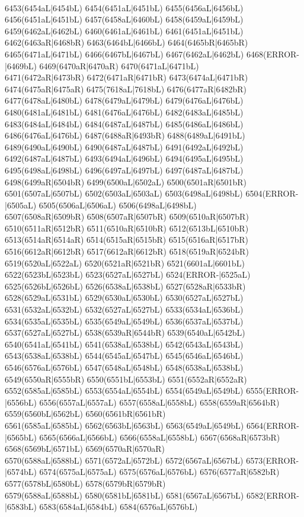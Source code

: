 \\6453(6454aL|6454bL) 6454(6451aL|6451bL) 6455(6456aL|6456bL) 6456(6451aL|6451bL) 6457(6458aL|6460bL) 6458(6459aL|6459bL) 6459(6462aL|6462bL) 6460(6461aL|6461bL) 6461(6451aL|6451bL) \\6462(6463aR|6468bR) 6463(6464bL|6466bL) 6464(6465bR|6465bR) 6465(6471aL|6471bL) 6466(6467bL|6467bL) 6467(6462aL|6462bL) 6468(ERROR-|6469bL) 6469(6470aR|6470aR) 6470(6471aL|6471bL) \\6471(6472aR|6473bR) 6472(6471aR|6471bR) 6473(6474aL|6471bR) 6474(6475aR|6475aR) 6475(7618aL|7618bL) 6476(6477aR|6482bR) 6477(6478aL|6480bL) 6478(6479aL|6479bL) 6479(6476aL|6476bL) \\6480(6481aL|6481bL) 6481(6476aL|6476bL) 6482(6483aL|6485bL) 6483(6484aL|6484bL) 6484(6487aL|6487bL) 6485(6486aL|6486bL) 6486(6476aL|6476bL) 6487(6488aR|6493bR) 6488(6489aL|6491bL) \\6489(6490aL|6490bL) 6490(6487aL|6487bL) 6491(6492aL|6492bL) 6492(6487aL|6487bL) 6493(6494aL|6496bL) 6494(6495aL|6495bL) 6495(6498aL|6498bL) 6496(6497aL|6497bL) 6497(6487aL|6487bL) \\6498(6499aR|6504bR) 6499(6500aL|6502aL) 6500(6501aR|6501bR) 6501(6507aL|6507bL) 6502(6503aL|6503aL) 6503(6498aL|6498bL) 6504(ERROR-|6505aL) 6505(6506aL|6506aL) 6506(6498aL|6498bL) \\6507(6508aR|6509bR) 6508(6507aR|6507bR) 6509(6510aR|6507bR) 6510(6511aR|6512bR) 6511(6510aR|6510bR) 6512(6513bL|6510bR) 6513(6514aR|6514aR) 6514(6515aR|6515bR) 6515(6516aR|6517bR) \\6516(6612aR|6612bR) 6517(6612aR|6612bR) 6518(6519aR|6524bR) 6519(6520aL|6522aL) 6520(6521aR|6521bR) 6521(6601aL|6601bL) 6522(6523bL|6523bL) 6523(6527aL|6527bL) 6524(ERROR-|6525aL) \\6525(6526bL|6526bL) 6526(6538aL|6538bL) 6527(6528aR|6533bR) 6528(6529aL|6531bL) 6529(6530aL|6530bL) 6530(6527aL|6527bL) 6531(6532aL|6532bL) 6532(6527aL|6527bL) 6533(6534aL|6536bL) \\6534(6535aL|6535bL) 6535(6549aL|6549bL) 6536(6537aL|6537bL) 6537(6527aL|6527bL) 6538(6539aR|6544bR) 6539(6540aL|6542bL) 6540(6541aL|6541bL) 6541(6538aL|6538bL) 6542(6543aL|6543bL) \\6543(6538aL|6538bL) 6544(6545aL|6547bL) 6545(6546aL|6546bL) 6546(6576aL|6576bL) 6547(6548aL|6548bL) 6548(6538aL|6538bL) 6549(6550aR|6555bR) 6550(6551bL|6553bL) 6551(6552aR|6552aR) \\6552(6585aL|6585bL) 6553(6554aL|6554bL) 6554(6549aL|6549bL) 6555(ERROR-|6556bL) 6556(6557aL|6557aL) 6557(6558aL|6558bL) 6558(6559aR|6564bR) 6559(6560bL|6562bL) 6560(6561bR|6561bR) \\6561(6585aL|6585bL) 6562(6563bL|6563bL) 6563(6549aL|6549bL) 6564(ERROR-|6565bL) 6565(6566aL|6566bL) 6566(6558aL|6558bL) 6567(6568aR|6573bR) 6568(6569bL|6571bL) 6569(6570aR|6570aR) \\6570(6588aL|6588bL) 6571(6572aL|6572bL) 6572(6567aL|6567bL) 6573(ERROR-|6574bL) 6574(6575aL|6575aL) 6575(6576aL|6576bL) 6576(6577aR|6582bR) 6577(6578bL|6580bL) 6578(6579bR|6579bR) \\6579(6588aL|6588bL) 6580(6581bL|6581bL) 6581(6567aL|6567bL) 6582(ERROR-|6583bL) 6583(6584aL|6584bL) 6584(6576aL|6576bL) 